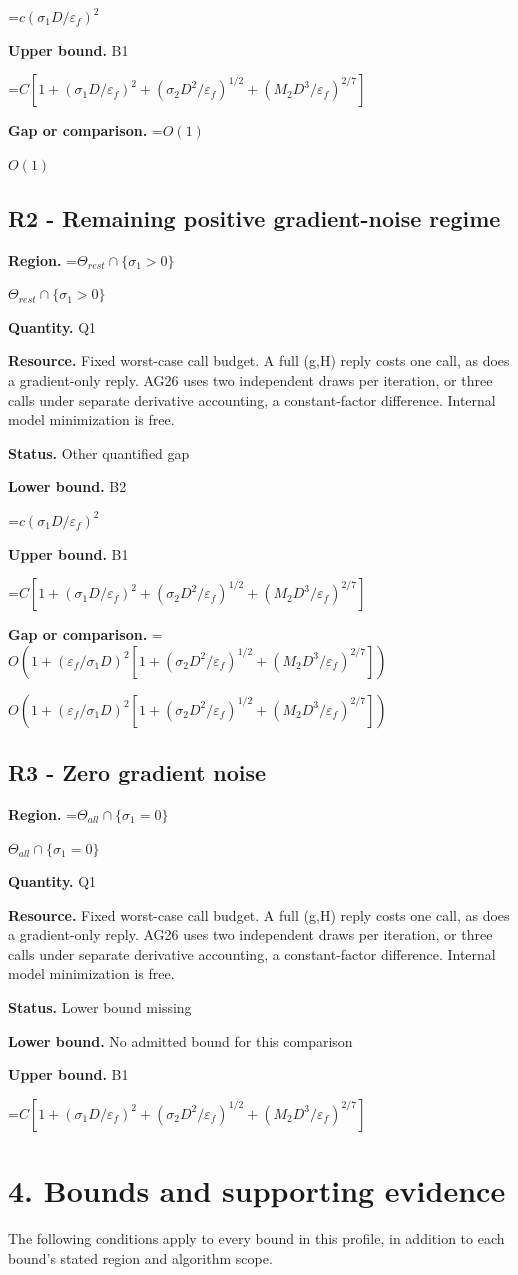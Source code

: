 \documentclass[10pt,a4paper]{article}
\newcommand{\AtlasMath}[1]{\par\begingroup\centering\setbox0=\hbox{$\displaystyle #1$}\ifdim\wd0>1.4\linewidth\typeout{ATLAS WIDE FORMULA: \the\wd0}\fi\ifdim\wd0>\linewidth\resizebox{\linewidth}{!}{\box0}\else\box0\fi\par\endgroup}
\newcommand{\AtlasInlineMath}[1]{\begingroup\setbox0=\hbox{$#1$}\ifdim\wd0>.4\linewidth\endgroup\AtlasMath{#1}\else\endgroup$#1$\fi}
\begin{document}
\AtlasMath{c(\sigma_1D/\varepsilon_f)^2}
\textbf{Upper bound.} B1

\AtlasMath{C[1+(\sigma_1D/\varepsilon_f)^2+(\sigma_2D^2/\varepsilon_f)^{1/2}+(M_2D^3/\varepsilon_f)^{2/7}]}
\textbf{Gap or comparison.} \AtlasInlineMath{O(1)}

\subsection{R2 - Remaining positive gradient-noise regime}
\textbf{Region.} \AtlasInlineMath{\Theta_{rest}\cap\{\sigma_1>0\}}

\textbf{Quantity.} Q1

\textbf{Resource.} Fixed worst-case call budget. A full (g,H) reply costs one call, as does a gradient-only reply. AG26 uses two independent draws per iteration, or three calls under separate derivative accounting, a constant-factor difference. Internal model minimization is free.

\textbf{Status.} Other quantified gap

\textbf{Lower bound.} B2

\AtlasMath{c(\sigma_1D/\varepsilon_f)^2}
\textbf{Upper bound.} B1

\AtlasMath{C[1+(\sigma_1D/\varepsilon_f)^2+(\sigma_2D^2/\varepsilon_f)^{1/2}+(M_2D^3/\varepsilon_f)^{2/7}]}
\textbf{Gap or comparison.} \AtlasInlineMath{O(1+(\varepsilon_f/\sigma_1D)^2[1+(\sigma_2D^2/\varepsilon_f)^{1/2}+(M_2D^3/\varepsilon_f)^{2/7}])}

\subsection{R3 - Zero gradient noise}
\textbf{Region.} \AtlasInlineMath{\Theta_{all}\cap\{\sigma_1=0\}}

\textbf{Quantity.} Q1

\textbf{Resource.} Fixed worst-case call budget. A full (g,H) reply costs one call, as does a gradient-only reply. AG26 uses two independent draws per iteration, or three calls under separate derivative accounting, a constant-factor difference. Internal model minimization is free.

\textbf{Status.} Lower bound missing

\textbf{Lower bound.} No admitted bound for this comparison

\textbf{Upper bound.} B1

\AtlasMath{C[1+(\sigma_1D/\varepsilon_f)^2+(\sigma_2D^2/\varepsilon_f)^{1/2}+(M_2D^3/\varepsilon_f)^{2/7}]}
\section{4. Bounds and supporting evidence}
The following conditions apply to every bound in this profile, in addition to each bound's stated region and algorithm scope.
\end{document}
